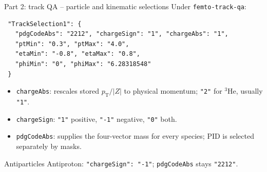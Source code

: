 \begin{frame}[fragile]{Part 2: track QA -- particle and kinematic selections}
 \small Under \texttt{femto-track-qa}:
 \begin{lstlisting}
 "TrackSelection1": {
   "pdgCodeAbs": "2212", "chargeSign": "1", "chargeAbs": "1",
   "ptMin": "0.3", "ptMax": "4.0",
   "etaMin": "-0.8", "etaMax": "0.8",
   "phiMin": "0", "phiMax": "6.28318548"
 }
 \end{lstlisting}
 \begin{itemize}
 \item \texttt{chargeAbs}: rescales stored $p_{\mathrm T}/|Z|$ to physical momentum; \texttt{"2"} for $^3$He, usually \texttt{"1"}.
 \item \texttt{chargeSign}: \texttt{"1"} positive, \texttt{"-1"} negative, \texttt{"0"} both.
 \item \texttt{pdgCodeAbs}: supplies the four-vector mass for every species; PID is selected separately by masks.
 \end{itemize}
 \begin{block}{Antiparticles}
 \footnotesize Antiproton: \texttt{"chargeSign": "-1"}; \texttt{pdgCodeAbs} stays \texttt{"2212"}.
 \end{block}
\end{frame}

